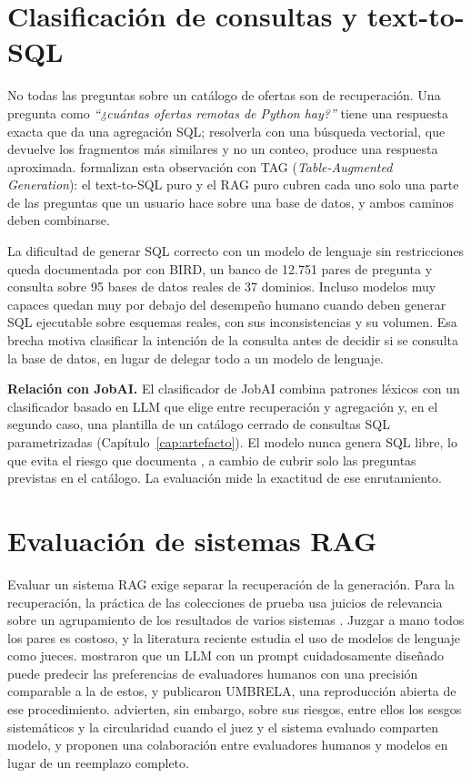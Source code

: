 \section{Clasificación de consultas y text-to-SQL}
\label{sec:estado-arte-hibrido}

No todas las preguntas sobre un catálogo de ofertas son de recuperación. Una pregunta como \textit{\enquote{¿cuántas ofertas remotas de Python hay?}} tiene una respuesta exacta que da una agregación SQL; resolverla con una búsqueda vectorial, que devuelve los fragmentos más similares y no un conteo, produce una respuesta aproximada. \citet{Biswal2024} formalizan esta observación con TAG (\textit{Table-Augmented Generation}): el text-to-SQL puro y el RAG puro cubren cada uno solo una parte de las preguntas que un usuario hace sobre una base de datos, y ambos caminos deben combinarse.

La dificultad de generar SQL correcto con un modelo de lenguaje sin restricciones queda documentada por \citet{Li2023} con BIRD, un banco de 12.751 pares de pregunta y consulta sobre 95 bases de datos reales de 37 dominios. Incluso modelos muy capaces quedan muy por debajo del desempeño humano cuando deben generar SQL ejecutable sobre esquemas reales, con sus inconsistencias y su volumen. Esa brecha motiva clasificar la intención de la consulta antes de decidir si se consulta la base de datos, en lugar de delegar todo a un modelo de lenguaje.

\textbf{Relación con JobAI.} El clasificador de JobAI combina patrones léxicos con un clasificador basado en LLM que elige entre recuperación y agregación y, en el segundo caso, una plantilla de un catálogo cerrado de consultas SQL parametrizadas (Capítulo~\ref{cap:artefacto}). El modelo nunca genera SQL libre, lo que evita el riesgo que documenta \citet{Li2023}, a cambio de cubrir solo las preguntas previstas en el catálogo. La evaluación mide la exactitud de ese enrutamiento.

\section{Evaluación de sistemas RAG}
\label{sec:estado-arte-evaluacion}

Evaluar un sistema RAG exige separar la recuperación de la generación. Para la recuperación, la práctica de las colecciones de prueba usa juicios de relevancia sobre un agrupamiento de los resultados de varios sistemas \citep{Sanderson2010}. Juzgar a mano todos los pares es costoso, y la literatura reciente estudia el uso de modelos de lenguaje como jueces. \citet{Thomas2024} mostraron que un LLM con un prompt cuidadosamente diseñado puede predecir las preferencias de evaluadores humanos con una precisión comparable a la de estos, y \citet{Upadhyay2024} publicaron UMBRELA, una reproducción abierta de ese procedimiento. \citet{Faggioli2023} advierten, sin embargo, sobre sus riesgos, entre ellos los sesgos sistemáticos y la circularidad cuando el juez y el sistema evaluado comparten modelo, y proponen una colaboración entre evaluadores humanos y modelos en lugar de un reemplazo completo.

